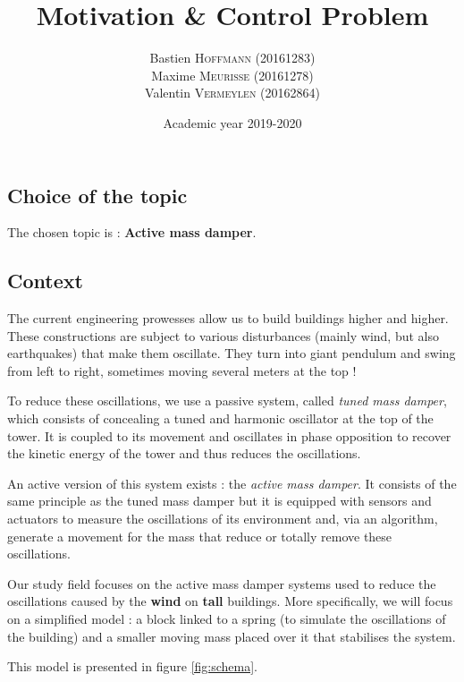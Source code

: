 \documentclass[a4paper, 12pt]{article}
\title{Motivation \& Control Problem}
\author{
    Bastien \textsc{Hoffmann} (20161283)\\
    Maxime \textsc{Meurisse} (20161278)\\
    Valentin \textsc{Vermeylen} (20162864)\\
}
\date{Academic year 2019-2020}
\begin{document}
    
    
    \subsection{Choice of the topic}
    The chosen topic is : {\bf Active mass damper}.
    
    \subsection{Context}
    The current engineering prowesses allow us to build buildings higher and higher. These constructions are subject to various disturbances (mainly wind, but also earthquakes) that make them oscillate. They turn into giant pendulum and swing from left to right, sometimes moving several meters at the top !\cite{YouTube_minutephysics}\par
    To reduce these oscillations, we use a passive system, called {\it tuned mass damper}, which consists of concealing a tuned and harmonic oscillator at the top of the tower. It is coupled to its movement and oscillates in phase opposition to recover the kinetic energy of the tower and thus reduces the oscillations.\cite{Wikipedia_amortisseur_tmd}\par
    An active version of this system exists : the {\it active mass damper}. It consists of the same principle as the tuned mass damper but it is equipped with sensors and actuators to measure the oscillations of its environment and, via an algorithm, generate a movement for the mass that reduce or totally remove these oscillations.\cite{sciencedirect_amd}\par
    Our study field focuses on the active mass damper systems used to reduce the oscillations caused by the {\bf wind} on {\bf tall} buildings. More specifically, we will focus on a simplified model : a block linked to a spring (to simulate the oscillations of the building) and a smaller moving mass placed over it that stabilises the system.\par
    This model is presented in figure \ref{fig:schema}.
\end{document}
